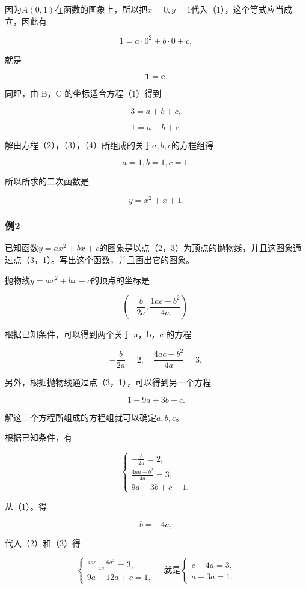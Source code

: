 因为\(A(0,1)\)在函数的图象上，所以把\(x = 0, y = 1\)代入（1），这个等式应当成立，因此有

\[
1 = a \cdot 0^{2} + b \cdot 0 + c,
\]

就是

\[
\mathbf {1} = \mathbf {c}. \tag {2}
\]

同理，由 B，C 的坐标适合方程（1）得到

\[
3 = a + b + c, \tag {3}
\]

\[
1 = a - b + c. \tag {4}
\]

解由方程（2），（3），（4）所组成的关于\(a, b, c\)的方程组得

\[
a = 1, b = 1, c = 1.
\]

所以所求的二次函数是

\[
y = x^{2} + x + 1.
\]

\subsubsection{例2}

已知函数\(y = ax^2 + bx + c\)的图象是以点（2，3）为顶点的抛物线，并且这图象通过点（3，1）。写出这个函数，并且画出它的图象。

 抛物线\(y = ax^2 + bx + c\)的顶点的坐标是

\[
\left(- \frac{b}{2 a}, \frac{1 a c - b^{2}}{4 a}\right).
\]

根据已知条件，可以得到两个关于 a，b，c 的方程

\[
- \frac{b}{2 a} = 2, \quad \frac{4 a c - b^{2}}{4 a} = 3,
\]

另外，根据抛物线通过点（3，1），可以得到另一个方程

\[
1 - 9 a + 3 b + c.
\]

解这三个方程所组成的方程组就可以确定\(a, b, c\)。

 根据已知条件，有

\[
\left\{ \begin{array}{l} - \frac{b}{2 a} = 2, \\ \frac{4 a a - b^{2}}{4 a} = 3, \\ 9 a + 3 b + c - 1. \end{array} \right. \tag {1}
\]

从（1）。得

\[
b = - 4 a, \tag {4}
\]

代入（2）和（3）得

\[
\left\{ \begin{array}{l} \frac{4 a c - 16 a^{2}}{4 a} = 3, \\ 9 a - 12 a + c = 1, \end{array} \right. \quad \text{就是} \left\{ \begin{array}{l} c - 4 a = 3, \\ a - 3 a = 1. \end{array} \right. \tag {5}
\]

